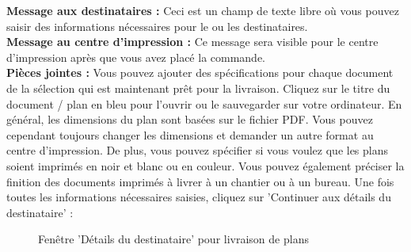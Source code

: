 \textbf{Message aux destinataires :} Ceci est un champ de texte libre où vous pouvez saisir des informations nécessaires pour le ou les destinataires. \\
\textbf{Message au centre d'impression :} Ce message sera visible pour le centre d'impression après que vous avez placé la commande. \\
\textbf{Pièces jointes :} Vous pouvez ajouter des spécifications pour chaque document de la sélection qui est maintenant prêt pour la livraison. Cliquez sur le titre du document / plan en bleu pour l'ouvrir ou le sauvegarder sur votre ordinateur.
En général, les dimensions du plan sont basées sur le fichier PDF. Vous pouvez cependant toujours changer les dimensions et demander un autre format au centre d'impression. De plus, vous pouvez spécifier si vous voulez que les plans soient imprimés en noir et blanc ou en couleur. Vous pouvez également préciser la finition des documents imprimés à livrer à un chantier ou à un bureau.
Une fois toutes les informations nécessaires saisies, cliquez sur 'Continuer aux détails du destinataire' :

\begin{figure}[H]
\caption{Fenêtre 'Détails du destinataire' pour livraison de plans}
\end{figure}

